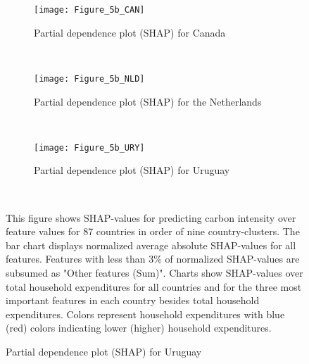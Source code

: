 \begin{figure}[ht!]\ContinuedFloat
    \centering
   \begin{subfigure}[b]{\textwidth}
         \centering
         \caption{Partial dependence plot (SHAP) for Canada}
         \label{fig:5b_CAN}
         \texttt{[image: Figure\_5b\_CAN]}         
     \end{subfigure}
    \\
    \vspace{0.5cm}
   \begin{subfigure}[b]{\textwidth}
         \centering
         \caption{Partial dependence plot (SHAP) for the Netherlands}
         \label{fig:5b_NLD}
         \texttt{[image: Figure\_5b\_NLD]}         
     \end{subfigure}
    \\
    \vspace{0.5cm}
   \begin{subfigure}[b]{\textwidth}
         \centering
         \caption{Partial dependence plot (SHAP) for Uruguay}
         \label{fig:5b_URY}
         \texttt{[image: Figure\_5b\_URY]}
    \end{subfigure}
    \\
    \vspace{0.5cm}
    \begin{subcaption2}
     This figure shows SHAP-values for predicting carbon intensity over feature values for 87 countries in order of nine country-clusters. The bar chart displays normalized average absolute SHAP-values for all features. Features with less than 3\% of normalized SHAP-values are subsumed as "Other features (Sum)". Charts show SHAP-values over total household expenditures for all countries and for the three most important features in each country besides total household expenditures. Colors represent household expenditures with blue (red) colors indicating lower (higher) household expenditures.
     \end{subcaption2}
\end{figure}

